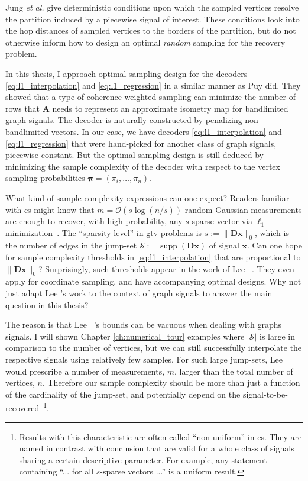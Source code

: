 Jung \textit{et al.} \cite{jung2016} give deterministic conditions upon which the sampled vertices resolve the partition induced by a piecewise signal of interest. These conditions look into the hop distances of sampled vertices to the borders of the partition, but do not otherwise inform how to design an optimal \emph{random} sampling for the recovery problem.

In this thesis, I approach optimal sampling design for the decoders \eqref{eq:l1_interpolation} and \eqref{eq:l1_regression} in a similar manner as Puy \etal \cite{puy2016} did. They showed that a type of coherence-weighted sampling can minimize the number of rows that $\mathbf{A}$ needs to represent an approximate isometry map for bandlimited graph signals. The decoder is naturally constructed by penalizing non-bandlimited vectors. In our case, we have decoders \eqref{eq:l1_interpolation} and \eqref{eq:l1_regression} that were hand-picked for another class of graph signals, piecewise-constant. But the optimal sampling design is still deduced by minimizing the sample complexity of the decoder with respect to the vertex sampling probabilities $\bm{\pi} = (\pi_i, \dots, \pi_n)$.

What kind of sample complexity expressions can one expect? Readers familiar with \acrlong{cs} might know that $m = \mathcal{O} \left( s \log (n/s) \right)$ random Gaussian measurements are enough to recover, with high probability, any $s$-sparse vector via $\ell_1$ minimization~\cite[Chapter 9]{foucart2013}. The ``sparsity-level'' in \acrfull{gtv} problems is $s := \|\mathbf{Dx}\|_0$, which is the number of edges in the jump-set $\mathcal{S} := \operatorname{supp}\left ( \mathbf{Dx} \right )$ of signal $\mathbf{x}$. Can one hope for sample complexity thresholds in \eqref{eq:l1_interpolation} that are proportional to $\|\mathbf{Dx}\|_0$? Surprisingly, such thresholds appear in the work of Lee \etal~\cite{lee2018}. They even apply for coordinate sampling, and have accompanying optimal designs. Why not just adapt Lee \etal's work to the context of graph signals to answer the main question in this thesis?

The reason is that Lee \etal~\cite{lee2018}'s bounds can be vacuous when dealing with graphs signals. I will shown Chapter \ref{ch:numerical_tour} examples where $|\mathcal{S}|$ is large in comparison to the number of vertices, but we can still successfully interpolate the respective signals using relatively few samples. For such large jump-sets, Lee \etal~\cite{lee2018} would prescribe a number of measurements, $m$, larger than the total number of vertices, $n$. Therefore our sample complexity should be more than just a function of the cardinality of the jump-set, and potentially depend on the signal-to-be-recovered~\footnote{Results with this characteristic are often called ``non-uniform'' in \acrlong{cs}. They are named in contrast with conclusion that are valid for a whole class of signals sharing a certain descriptive parameter. For example, any statement containing ``... for all $s$-sparse vectors ...'' is a uniform result.}.

